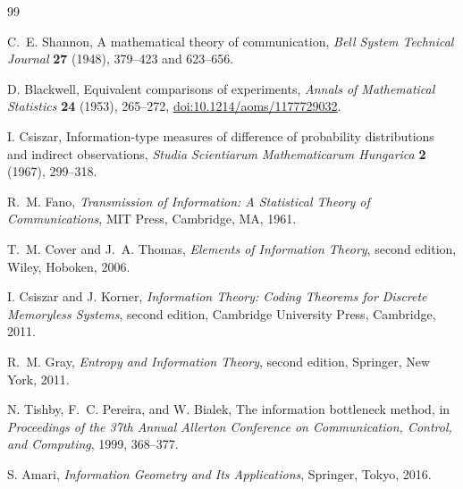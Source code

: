 \documentclass[11pt,a4paper]{article}
\theoremstyle{definition}
\theoremstyle{plain}
\theoremstyle{remark}
\newcommand{\1}{\mathbf{1}}
\begin{document}
\begin{thebibliography}{99}

C.~E. Shannon,
\newblock A mathematical theory of communication,
\newblock \emph{Bell System Technical Journal} \textbf{27} (1948),
379--423 and 623--656.

D. Blackwell,
\newblock Equivalent comparisons of experiments,
\newblock \emph{Annals of Mathematical Statistics} \textbf{24} (1953),
265--272,
\newblock \href{https://doi.org/10.1214/aoms/1177729032}
{doi:10.1214/aoms/1177729032}.

I. Csiszar,
\newblock Information-type measures of difference of probability
distributions and indirect observations,
\newblock \emph{Studia Scientiarum Mathematicarum Hungarica} \textbf{2}
(1967), 299--318.

R.~M. Fano,
\newblock \emph{Transmission of Information: A Statistical Theory of
Communications},
\newblock MIT Press, Cambridge, MA, 1961.

T.~M. Cover and J.~A. Thomas,
\newblock \emph{Elements of Information Theory}, second edition,
\newblock Wiley, Hoboken, 2006.

I. Csiszar and J. Korner,
\newblock \emph{Information Theory: Coding Theorems for Discrete
Memoryless Systems}, second edition,
\newblock Cambridge University Press, Cambridge, 2011.

R.~M. Gray,
\newblock \emph{Entropy and Information Theory}, second edition,
\newblock Springer, New York, 2011.

N. Tishby, F.~C. Pereira, and W. Bialek,
\newblock The information bottleneck method,
\newblock in \emph{Proceedings of the 37th Annual Allerton Conference on
Communication, Control, and Computing}, 1999, 368--377.

S. Amari,
\newblock \emph{Information Geometry and Its Applications},
\newblock Springer, Tokyo, 2016.

\end{thebibliography}
\end{document}
